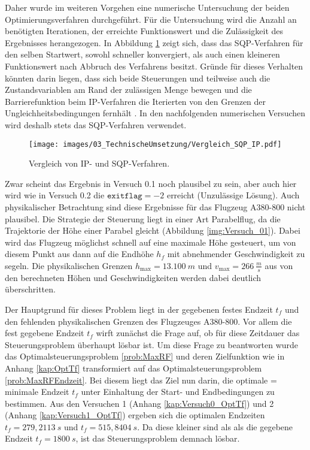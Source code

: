 Daher wurde im weiteren Vorgehen eine numerische Untersuchung der beiden Optimierungsverfahren durchgeführt. Für die Untersuchung wird die Anzahl an benötigten Iterationen, der erreichte Funktionswert und die Zulässigkeit des Ergebnisses herangezogen. In Abbildung \ref{img:Vergleich_SQP_IP} zeigt sich, dass das SQP-Verfahren für den selben Startwert, sowohl schneller konvergiert, als auch einen kleineren Funktionswert nach Abbruch des Verfahrens besitzt. Gründe für dieses Verhalten könnten darin liegen, dass sich beide Steuerungen und teilweise auch die Zustandsvariablen am Rand der zulässigen Menge bewegen und die Barrierefunktion beim IP-Verfahren die Iterierten von den Grenzen der Ungleichheitsbedingungen fernhält \cite{Matlab2016}. In den nachfolgenden numerischen Versuchen wird deshalb stets das SQP-Verfahren verwendet.
\begin{figure}[H]
    \begin{center}
        \texttt{[image: images/03\_TechnischeUmsetzung/Vergleich\_SQP\_IP.pdf]}
        \caption{Vergleich von IP- und SQP-Verfahren.}\label{img:Vergleich_SQP_IP}
    \end{center}
\end{figure}
Zwar scheint das Ergebnis in Versuch 0.1 noch plausibel zu sein, aber auch hier wird wie in Versuch 0.2 die $\texttt{exitflag} = -2$ erreicht (Unzulässige Lösung). Auch physikalischer Betrachtung sind diese Ergebnisse für das Flugzeug A380-800 nicht plausibel. Die Strategie der Steuerung liegt in einer Art Parabelflug, da die Trajektorie der Höhe einer Parabel gleicht (Abbildung \ref{img:Versuch_01}). Dabei wird das Flugzeug möglichst schnell auf eine maximale Höhe gesteuert, um von diesem Punkt aus dann auf die Endhöhe $h_f$ mit abnehmender Geschwindigkeit zu segeln. Die physikalischen Grenzen $h_{\max} = 13.100 \ m$ und $v_{\max} = 266 \ \frac{m}{s}$ aus \cite{A380Tech} von den berechneten Höhen und Geschwindigkeiten werden dabei deutlich überschritten.

Der Hauptgrund für dieses Problem liegt in der gegebenen festes Endzeit $t_f$ und den fehlenden physikalischen Grenzen des Flugzeuges A380-800. Vor allem die fest gegebene Endzeit $t_f$ wirft zunächst die Frage auf, ob für diese Zeitdauer das Steuerungsproblem überhaupt lösbar ist. Um diese Frage zu beantworten wurde das Optimalsteuerungsproblem \ref{prob:MaxRF} und deren Zielfunktion wie in Anhang \ref{kap:OptTf} transformiert auf das Optimalsteuerungsproblem \ref{prob:MaxRFEndzeit}. Bei diesem liegt das Ziel nun darin, die optimale = minimale Endzeit $t_f$ unter Einhaltung der Start- und Endbedingungen zu bestimmen. Aus den Versuchen 1 (Anhang \ref{kap:Versuch0_OptTf}) und 2 (Anhang \ref{kap:Versuch1_OptTf}) ergeben sich die optimalen Endzeiten $t_f = 279,2113 \ s$ und $t_f = 515,8404 \ s$. Da diese kleiner sind als als die gegebene Endzeit $t_f = 1800 \ s$, ist das Steuerungsproblem demnach lösbar.

